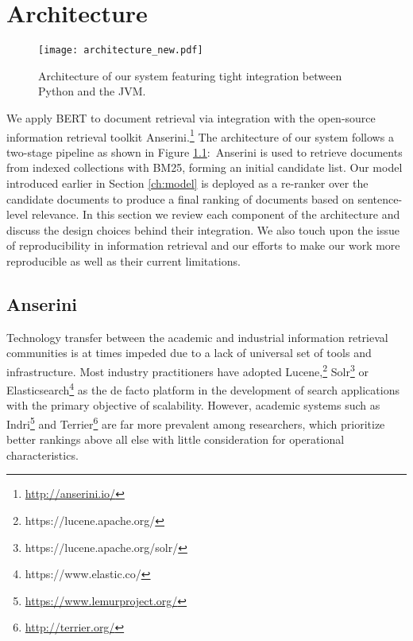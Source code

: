 \chapter{Architecture}
\label{ch:arch}

\begin{figure}[b!]
\centering
  \texttt{[image: architecture\_new.pdf]}
\caption{Architecture of our system featuring tight integration between Python and the JVM.}
\label{fig:arch}
\end{figure}

We apply BERT to document retrieval via integration with the open-source information retrieval toolkit Anserini.\footnote{\url{http://anserini.io/}}
The architecture of our system follows a two-stage pipeline as shown in Figure \ref{fig:arch}:\
Anserini is used to retrieve documents from indexed collections with BM25, forming an initial candidate list.
Our model introduced earlier in Section \ref{ch:model} is deployed as a re-ranker over the candidate documents to produce a final ranking of documents based on sentence-level relevance.
In this section we review each component of the architecture and discuss the design choices behind their integration.
We also touch upon the issue of reproducibility in information retrieval and our efforts to make our work more reproducible as well as their current limitations.

\section{Anserini}

Technology transfer between the academic and industrial information retrieval communities is at times impeded due to a lack of universal set of tools and infrastructure.
Most industry practitioners have adopted Lucene,\footnote{https://lucene.apache.org/} Solr\footnote{https://lucene.apache.org/solr/} or Elasticsearch\footnote{https://www.elastic.co/} as the de facto platform in the development of search applications with the primary objective of scalability.
However, academic systems such as Indri\footnote{\url{https://www.lemurproject.org/}} and Terrier\footnote{\url{http://terrier.org/}} are far more prevalent among researchers, which prioritize better rankings above all else with little consideration for operational characteristics.


